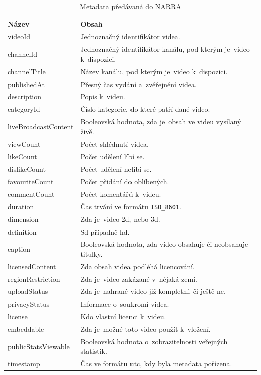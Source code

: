 \begin{table}[!ht]
\centering
\begin{tabular}{| p{} | p{} |}
\hline
	\textbf{Název} & \textbf{Obsah} \\
\hline
\hline
	videoId & Jednoznačný identifikátor videa. \\
\hline
	channelId & Jednoznačný identifikátor kanálu, pod kterým je~video k~dispozici. \\
\hline
	channelTitle & Název kanálu, pod kterým je~video k~dispozici. \\
\hline
	publishedAt & Přesný čas vydání a~zvěřejnění videa. \\
\hline
	description & Popis k~videu. \\
\hline
	categoryId & Číslo kategorie, do které patří dané video. \\
\hline
	liveBroadcastContent & Booleovská hodnota, zda je~obsah ve videu vysílaný živě. \\
\hline
	viewCount & Počet shlédnutí videa. \\
\hline
	likeCount & Počet udělení líbí se. \\
\hline
	dislikeCount & Počet udělení nelíbí se. \\
\hline
	favouriteCount & Počet přidání do oblíbených. \\
\hline
	commentCount & Počet komentářů k~videu. \\
\hline
	duration & Čas trvání ve formátu \texttt{ISO\_8601}. \\
\hline
	dimension & Zda je~video 2d, nebo 3d. \\
\hline
	definition & Sd případně hd. \\
\hline
	caption & Booleovská hodnota, zda video obsahuje či neobsahuje titulky. \\
\hline
	licensedContent & Zda obsah videa podléhá licencování. \\
\hline
	regionRestriction & Zda je~video zakázané v~nějaká zemi. \\
\hline
	uploadStatus & Zda je~nahrané video již kompletní, či ještě ne. \\
\hline
	privacyStatus & Informace o~soukromí videa. \\
\hline
	license & Kdo vlastní licenci k~videu. \\
\hline
	embeddable & Zda je~možné toto video použít k~vložení. \\
\hline
	publicStatsViewable & Booleovská hodnota o~zobrazitelnosti veřejných statistik. \\
\hline
	timestamp & Čas ve formátu utc, kdy byla metadata pořízena. \\
\hline
\end{tabular}
\caption[Metadata předávaná do NARRA]{Metadata předávaná do NARRA}\label{tab:bson}
\end{table}

